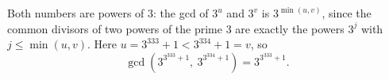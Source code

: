 Both numbers are powers of $3$: the gcd of $3^u$ and $3^v$ is $3^{\min(u,v)}$, since the common divisors of two powers of the prime $3$ are exactly the powers $3^j$ with $j\le\min(u,v)$. Here $u=3^{333}+1<3^{334}+1=v$, so
\[\gcd\left(3^{3^{333}+1},\ 3^{3^{334}+1}\right)=\boxed{3^{3^{333}+1}}.\]
